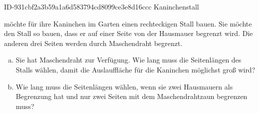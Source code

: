 \begin{exercise}
      {ID-931cbf2a3b59a1a6d583794cd8099ce3e8d16ccc}
      {Kaninchenstall}
  \ifproblem\problem\par
    \xxa{} möchte für ihre Kaninchen im Garten einen rechteckigen Stall
    bauen. Sie möchte den Stall so bauen, dass er auf einer Seite von der
    Hausmauer begrenzt wird. Die anderen drei Seiten werden durch Maschendraht
    begrenzt.
    \begin{enumerate}[a)]
      \item Sie hat  Maschendraht zur Verfügung. Wie lang muss
            \xxa{} die Seitenlängen des Stalls wählen, damit die Auslauffläche für
            die Kaninchen möglichst groß wird?
      \item Wie lang muss \xxa{} die Seitenlängen wählen, wenn sie zwei
            Hausmauern als Begrenzung hat und nur zwei Seiten mit dem
            Maschendrahtzaun begrenzen muss?
    \end{enumerate}
  \fi
\end{exercise}
